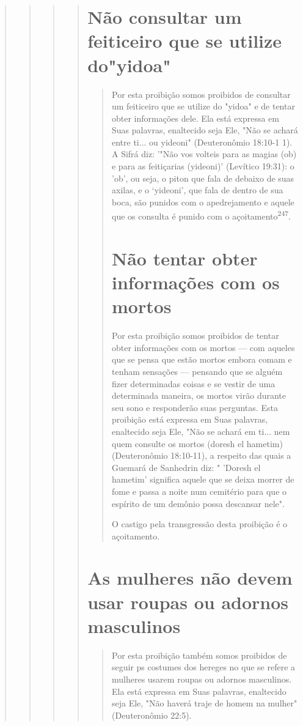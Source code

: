 \begin{quote}
\begin{quote}
\begin{quote}
\begin{quote}
\section{Não consultar um feiticeiro que se utilize do"yidoa"}

\begin{quote}
Por esta proibição somos proibidos de consultar um feiticeiro que se
utilize do "yidoa" e de tentar obter informações dele. Ela está expressa
em Suas palavras, enaltecido seja Ele, "Não se achará entre ti... ou
yideoni" (Deute­ronômio 18:10-1 1). A Sifrá diz: '"Não vos volteis para
as magias (ob) e para as feitiçarias (yideoni)' (Levítico 19:31): o
'ob', ou seja, o piton que fala de debaixo de suas axilas, e o
`yideoni', que fala de dentro de sua boca, são punidos com o
apedrejamento e aquele que os consulta é punido com o
açoitamento\textsuperscript{247}.

\section{Não tentar obter informações com os mortos}

Por esta proibição somos proibidos de tentar obter informações com os
mortos --- com aqueles que se pensa que estão mortos embora comam e
te­nham sensações --- pensando que se alguém fizer determinadas coisas e
se vestir de uma determinada maneira, os mortos virão durante seu sono e
responderão suas perguntas. Esta proibição está expressa em Suas
palavras, enaltecido seja Ele, "Não se achará em ti... nem quem consulte
os mortos (doresh el hametim) (Deuteronômio 18:10-11), a respeito das
quais a Guemará de Sanhedrin diz: " 'Do­resh el hametim' significa
aquele que se deixa morrer de fome e passa a noite num cemitério para
que o espírito de um demônio possa descansar nele".

O castigo pela transgressão desta proibição é o açoitamento.
\end{quote}

\section{As mulheres não devem usar roupas ou adornos masculinos}

\begin{quote}
Por esta proibição também somos proibidos de seguir ps costumes dos
hereges no que se refere a mulheres usarem roupas ou adornos
masculi­nos. Ela está expressa em Suas palavras, enaltecido seja Ele,
"Não haverá traje de homem na mulher" (Deuteronômio 22:5).


\end{quote}
\end{quote}
\end{quote}
\end{quote}
\end{quote}
